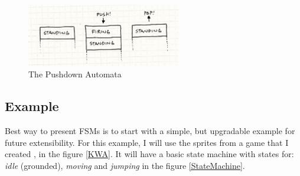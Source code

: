 \documentclass[a4paper, 12pt]{book}
\begin{document}
\begin{figure}[h]
\begin{center}
\includegraphics[width=0.6\textwidth]{Images/state_pushdown.png}
\end{center}
\caption{The Pushdown Automata}
\label{pic2}
\end{figure}

\subsection{Example}

Best way to present FSMs is to start with a simple, but upgradable example for future extensibility. For this example, I will use the sprites from a game that I created \cite{KWA}, in the figure \ref{KWA}. It will have a basic state machine with states for: \emph{idle} (grounded), \emph{moving} and \emph{jumping} in the figure \ref{StateMachine}.
\end{document}

